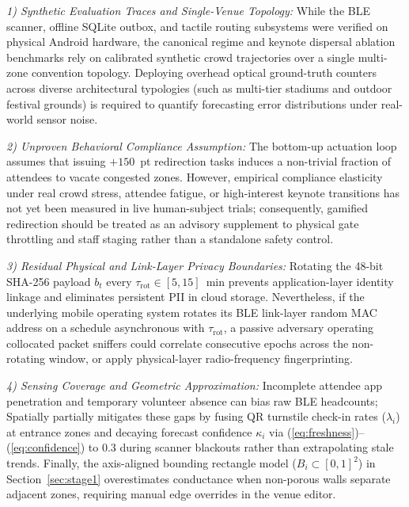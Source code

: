 \documentclass[conference,a4paper]{IEEEtran}
\begin{document}
\emph{1) Synthetic Evaluation Traces and Single-Venue Topology:} While the BLE scanner, offline SQLite outbox, and tactile routing subsystems were verified on physical Android hardware, the canonical regime and keynote dispersal ablation benchmarks rely on calibrated synthetic crowd trajectories over a single multi-zone convention topology. Deploying overhead optical ground-truth counters across diverse architectural typologies (such as multi-tier stadiums and outdoor festival grounds) is required to quantify forecasting error distributions under real-world sensor noise.

\emph{2) Unproven Behavioral Compliance Assumption:} The bottom-up actuation loop assumes that issuing $+150$~pt redirection tasks induces a non-trivial fraction of attendees to vacate congested zones. However, empirical compliance elasticity under real crowd stress, attendee fatigue, or high-interest keynote transitions has not yet been measured in live human-subject trials; consequently, gamified redirection should be treated as an advisory supplement to physical gate throttling and staff staging rather than a standalone safety control.

\emph{3) Residual Physical and Link-Layer Privacy Boundaries:} Rotating the 48-bit SHA-256 payload $b_t$ every $\tau_{\mathrm{rot}} \in [5, 15]$~min prevents application-layer identity linkage and eliminates persistent PII in cloud storage. Nevertheless, if the underlying mobile operating system rotates its BLE link-layer random MAC address on a schedule asynchronous with $\tau_{\mathrm{rot}}$, a passive adversary operating collocated packet sniffers could correlate consecutive epochs across the non-rotating window, or apply physical-layer radio-frequency fingerprinting.

\emph{4) Sensing Coverage and Geometric Approximation:} Incomplete attendee app penetration and temporary volunteer absence can bias raw BLE headcounts; Spatially partially mitigates these gaps by fusing QR turnstile check-in rates ($\lambda_i$) at entrance zones and decaying forecast confidence $\kappa_i$ via (\ref{eq:freshness})--(\ref{eq:confidence}) to $0.3$ during scanner blackouts rather than extrapolating stale trends. Finally, the axis-aligned bounding rectangle model ($B_i \subset [0,1]^2$) in Section~\ref{sec:stage1} overestimates conductance when non-porous walls separate adjacent zones, requiring manual edge overrides in the venue editor.
\end{document}
